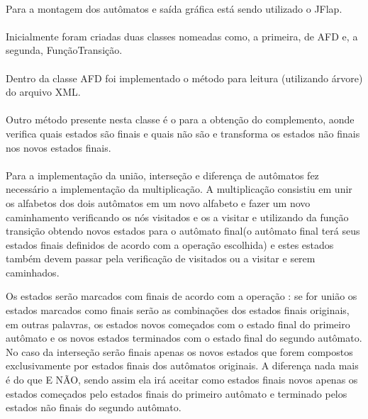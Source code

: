 \documentclass[a4paper,portuguese,12pt]{article}
\begin{document}
\paragraph{} Para a montagem dos autômatos e saída gráfica está sendo utilizado o JFlap.

\paragraph{} Inicialmente foram criadas duas classes nomeadas como, a primeira, de AFD e, a segunda, FunçãoTransição.

\paragraph{} Dentro da classe AFD foi implementado o método para leitura (utilizando árvore) do arquivo XML.

\paragraph{}Outro método presente nesta classe é o para a obtenção do complemento, aonde verifica quais estados são finais e quais não são e transforma os estados não finais nos novos estados finais.

\paragraph{}Para a implementação  da união, interseção e diferença de autômatos fez necessário a implementação da multiplicação. A multiplicação consistiu em unir os alfabetos dos dois autômatos em um novo alfabeto e fazer um novo caminhamento verificando os nós visitados e os a visitar e utilizando da função transição obtendo novos estados para o autômato final(o autômato final terá seus estados finais definidos de acordo com a operação escolhida) e estes estados também devem passar pela verificação de visitados ou a visitar e serem caminhados.

Os estados serão marcados com finais de acordo com a operação : se for união os estados marcados como finais serão as combinações dos estados finais originais, em outras palavras, os estados novos começados com o estado final do primeiro autômato e os novos estados terminados com o estado final do segundo autômato. No caso da interseção serão finais apenas os novos estados que forem compostos exclusivamente por estados finais dos autômatos originais. A diferença nada mais é do que E NÃO, sendo assim ela irá aceitar como estados finais novos apenas os estados começados pelo estados finais do primeiro autômato e terminado pelos estados não finais do segundo autômato.
\end{document}
